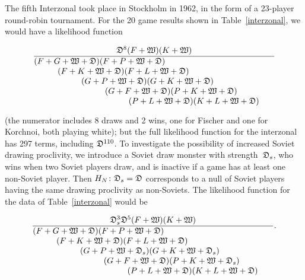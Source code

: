 \documentclass[review]{elsarticle}
\begin{document}
The fifth Interzonal took place in Stockholm in 1962, in the form of a
23-player round-robin tournament.  For the 20 game results shown in
Table~\ref{interzonal}, we would have a likelihood function

\begin{equation}
\frac{
  \draw^8(F+\white)(K+\white)
}{\parbox{4in}{$
    (F+G+\white+\draw)(F+P+\white+\draw)\\ \rule{10mm}{0mm}(F+K+\white+\draw)  (F+L+\white+\draw)\\ \rule{20mm}{0mm}
         (G+P+\white+\draw)  (G+K+\white+\draw)\\ \rule{30mm}{0mm}(G+F+\white+\draw)
                    (P+K+\white+\draw)\\ \rule{40mm}{0mm}(P+L+\white+\draw)
                               (K+L+\white+\draw)
 $}}
\end{equation}

\noindent (the numerator includes 8 draws and 2 wins, one for Fischer
and one for Korchnoi, both playing white); but the full likelihood
function for the interzonal has 297 terms, including $\mathfrak{D}^{110}$.
To investigate the possibility of increased Soviet drawing proclivity,
we introduce a Soviet draw monster with strength~$\mathfrak{D}_s$, who wins
when two Soviet players draw, and is inactive if a game has at least
one non-Soviet player.  Then $H_N\colon \mathfrak{D}_s=\mathfrak{D}$ corresponds to
a null of Soviet players having the same drawing proclivity as
non-Soviets.  The likelihood function for the data of
Table~\ref{interzonal} would be

\begin{equation}\label{collusion}
\frac{
  \draw_s^3\draw^5(F+\white)(K+\white)
}{\parbox{4in}{$    (F+G+\white+\draw)(F+P+\white+\draw)\\ \rule{10mm}{0mm}(F+K+\white+\draw)  (F+L+\white+\draw)\\ \rule{20mm}{0mm}
         (G+P+\white+\draw_s)  (G+K+\white+\draw_s)\\ \rule{30mm}{0mm}(G+F+\white+\draw)
                    (P+K+\white+\draw_s)\\ \rule{40mm}{0mm}(P+L+\white+\draw)
                               (K+L+\white+\draw)
 $}}.
\end{equation}
\end{document}
